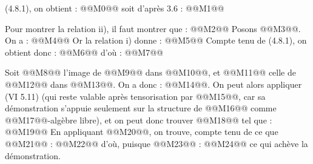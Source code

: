 
(4.8.1), on obtient :
@@M0@@
soit d'après 3.6 :
@@M1@@

Pour montrer la relation ii), il faut montrer que :
@@M2@@
Posons @@M3@@. On a :
@@M4@@
Or la relation i) donne :
@@M5@@
Compte tenu de (4.8.1), on obtient donc :
@@M6@@
d'où :
@@M7@@

Soit @@M8@@ l'image de @@M9@@ dans @@M10@@, et @@M11@@ celle de @@M12@@ dans @@M13@@. On a donc : @@M14@@. On peut alors appliquer (VI 5.11) (qui reste valable après tensorisation par @@M15@@, car sa démonstration s'appuie seulement sur la structure de @@M16@@ comme @@M17@@-algèbre libre), et on peut donc trouver @@M18@@ tel que :
@@M19@@
En appliquant @@M20@@, on trouve, compte tenu de ce que @@M21@@ :
@@M22@@
d'où, puisque @@M23@@ :
@@M24@@
ce qui achève la démonstration.

